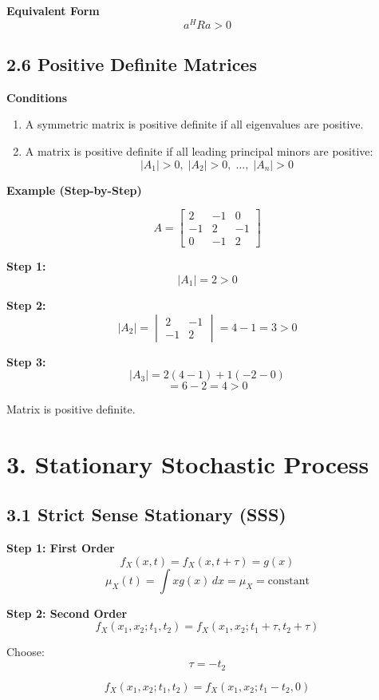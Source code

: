 \documentclass[12pt]{article}
\begin{document}
\textbf{Equivalent Form}
\[
a^H R a > 0
\]

\subsection*{2.6 Positive Definite Matrices}

\textbf{Conditions}

\begin{enumerate}
\item A symmetric matrix is positive definite if all eigenvalues are positive.
\item A matrix is positive definite if all leading principal minors are positive:
\[
|A_1|>0,\; |A_2|>0,\; \dots,\; |A_n|>0
\]
\end{enumerate}

\textbf{Example (Step-by-Step)}

\[
A =
\begin{bmatrix}
2 & -1 & 0\\
-1 & 2 & -1\\
0 & -1 & 2
\end{bmatrix}
\]

\textbf{Step 1:}
\[
|A_1| = 2 > 0
\]

\textbf{Step 2:}
\[
|A_2| =
\begin{vmatrix}
2 & -1\\
-1 & 2
\end{vmatrix}
= 4 - 1 = 3 > 0
\]

\textbf{Step 3:}
\[
|A_3| = 2(4-1) + 1(-2 - 0)
\]
\[
= 6 - 2 = 4 > 0
\]

Matrix is positive definite.

\section*{3. Stationary Stochastic Process}

\subsection*{3.1 Strict Sense Stationary (SSS)}

\textbf{Step 1: First Order}
\[
f_X(x,t) = f_X(x,t+\tau) = g(x)
\]
\[
\mu_X(t) = \int x g(x)\,dx = \mu_X = \text{constant}
\]

\textbf{Step 2: Second Order}
\[
f_X(x_1,x_2;t_1,t_2) = f_X(x_1,x_2;t_1+\tau,t_2+\tau)
\]

Choose:
\[
\tau = -t_2
\]

\[
f_X(x_1,x_2;t_1,t_2) = f_X(x_1,x_2;t_1 - t_2,0)
\]
\end{document}
